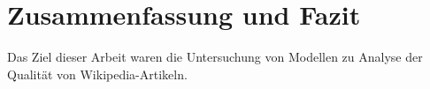 \section{Zusammenfassung und Fazit}
Das Ziel dieser Arbeit waren die Untersuchung von Modellen zu Analyse der Qualität von Wikipedia-Artikeln.